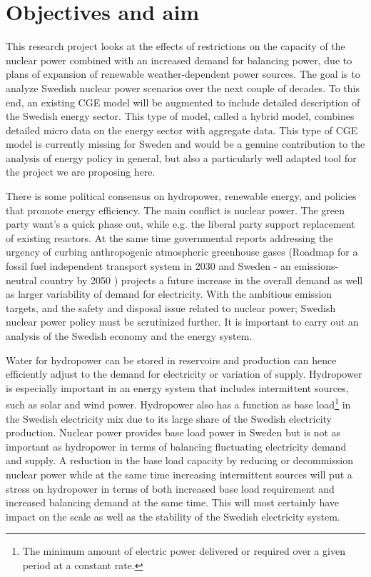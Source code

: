 \section{Objectives and aim}
This research project looks at the effects of restrictions on the capacity of the nuclear power combined with an increased demand for balancing power, due to plans of expansion of renewable weather-dependent power sources. The goal is to analyze Swedish nuclear power scenarios over the next couple of decades. To this end, an existing CGE model will be augmented to include detailed description of the Swedish energy sector. This type of model, called a hybrid model, combines detailed micro data on the energy sector with aggregate data. This type of CGE model is currently missing for Sweden and would be a genuine contribution to the analysis of energy policy in general, but also a particularly well adapted tool for the project we are proposing here.

There is some political consensus on hydropower, renewable energy, and policies that promote energy efficiency. The main conflict is nuclear power. The green party want's a quick phase out, while e.g. the liberal party support replacement of existing reactors. At the same time governmental reports addressing the urgency of curbing anthropogenic atmospheric greenhouse gases (Roadmap for a fossil fuel independent transport system in 2030 \cite{SOU201384} and Sweden - an emissions-neutral country by 2050 \cite{sepa2012}) projects a future increase in the overall demand as well as larger variability of demand for electricity. With the ambitious emission targets, and the safety and disposal issue related to nuclear power; Swedish nuclear power policy must be scrutinized further. It is important to carry out an analysis of the Swedish economy and the energy system.

Water for hydropower can be stored in reservoirs and production can hence efficiently adjust to the demand for electricity or variation of supply. Hydropower is especially important in an energy system that includes intermittent sources, such as solar and wind power. Hydropower also has a function as base load\footnote{The minimum amount of electric power delivered or required over a given period at a constant rate.} in the Swedish electricity mix due to its large share of the Swedish electricity production. Nuclear power provides base load power in Sweden but is not as important as hydropower in terms of balancing fluctuating electricity demand and supply. A reduction in the base load capacity by reducing or decommission nuclear power while at the same time increasing intermittent sources will put a stress on hydropower in terms of both increased base load requirement and increased balancing demand at the same time. This will most certainly have impact on the scale as well as the stability of the Swedish electricity system.


